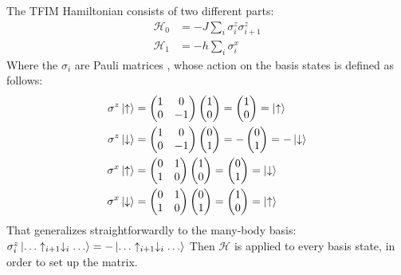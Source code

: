 \documentclass[a4paper,12pt]{article}
\begin{document}
The TFIM Hamiltonian consists of two different parts:
\begin{align}
\label{eq:5}
\mathcal{H}_0 &= -J \sum\limits_{i}\sigma_i^z\sigma_{i+1}^z\\
\mathcal{H}_1 &= -h \sum\limits_i^{}\sigma_i^{x}
\end{align}
Where the $\sigma_i$ are Pauli matrices , whose action on the basis states is defined as follows:
\begin{align*}
\sigma^z \ket{\uparrow} &= 
\begin{pmatrix}
1 & 0\\
0 & -1
\end{pmatrix}
\begin{pmatrix}
1\\
0
\end{pmatrix} = 
\begin{pmatrix}
1\\
0
\end{pmatrix} = \ket{\uparrow}
\\
\sigma^z \ket{\downarrow} &= 
\begin{pmatrix}
1 & 0\\
0 & -1
\end{pmatrix}
\begin{pmatrix}
0\\
1
\end{pmatrix} = -
\begin{pmatrix}
0\\
1
\end{pmatrix} = -\ket{\downarrow}
\\
\sigma^x \ket{\uparrow} &= 
\begin{pmatrix}
0 & 1\\
1 & 0
\end{pmatrix}
\begin{pmatrix}
1\\
0
\end{pmatrix} = 
\begin{pmatrix}
0\\
1
\end{pmatrix} = \ket{\downarrow}
\\
\sigma^x \ket{\downarrow} &= 
\begin{pmatrix}
0 & 1\\
1 & 0
\end{pmatrix}
\begin{pmatrix}
0\\
1
\end{pmatrix} =
\begin{pmatrix}
1\\
0
\end{pmatrix} = \ket{\uparrow}
\end{align*}
That generalizes straightforwardly to the many-body basis: $\sigma_i^z
\ket{\dotso \uparrow_{i+1} \downarrow_i \dotso} = - \ket{\dotso
  \uparrow_{i+1} \downarrow_i\dotso} $ Then $\mathcal{H}$ is applied
to every basis state, in order to set up the matrix.
\end{document}

